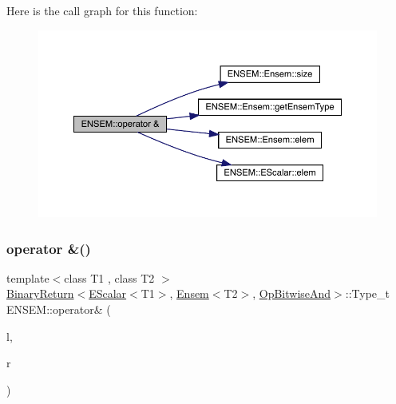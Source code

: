 Here is the call graph for this function\+:\nopagebreak
\begin{figure}[H]
\begin{center}
\leavevmode
\includegraphics[width=350pt]{d1/d9e/group__eensem_gadd38c6dbde8cad60658e2a3429480978_cgraph}
\end{center}
\end{figure}
\mbox{\label{group__eensem_ga81252fa8c928f420f2676e632c49a421}} 
\subsubsection{\texorpdfstring{operator \&()}{operator \&()}\hspace{0.1cm}{\footnotesize\ttfamily [3/3]}}
{\footnotesize\ttfamily template$<$class T1 , class T2 $>$ \\
\mbox{\hyperlink{structENSEM_1_1BinaryReturn}{Binary\+Return}}$<$\mbox{\hyperlink{classENSEM_1_1EScalar}{E\+Scalar}}$<$T1$>$, \mbox{\hyperlink{classENSEM_1_1Ensem}{Ensem}}$<$T2$>$, \mbox{\hyperlink{structENSEM_1_1OpBitwiseAnd}{Op\+Bitwise\+And}}$>$\+::Type\+\_\+t E\+N\+S\+E\+M\+::operator\& (\begin{DoxyParamCaption}\item[{const \mbox{\hyperlink{classENSEM_1_1EScalar}{E\+Scalar}}$<$ T1 $>$ \&}]{l,  }\item[{const \mbox{\hyperlink{classENSEM_1_1Ensem}{Ensem}}$<$ T2 $>$ \&}]{r }\end{DoxyParamCaption})\hspace{0.3cm}{\ttfamily [inline]}}

